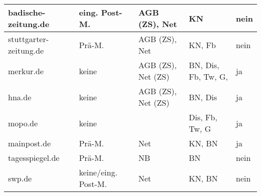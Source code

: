 \begin{landscape}
\begin{longtable}{l|llll}
badische-zeitung.de	& eing. Post-M.		& AGB (ZS), Net			& KN 							& nein \tabularnewline \hline
stuttgarter-zeitung.de	& Prä-M.		& AGB (ZS), Net			& KN, Fb 						& nein \tabularnewline \hline
merkur.de			& keine			& AGB (ZS), Net (ZS)		& BN, Dis, Fb, Tw, G, 				& ja \tabularnewline \hline
hna.de			& keine			& AGB (ZS), Net (ZS)		& BN, Dis 						& ja \tabularnewline \hline
mopo.de			& keine			&				& Dis, Fb, Tw, G 					& ja \tabularnewline \hline
mainpost.de		& Prä-M.		& Net				& KN, BN 						& ja \tabularnewline \hline
tagesspiegel.de		& Prä-M.		& NB				& BN 							& nein \tabularnewline \hline
swp.de			& keine/eing. Post-M.	& Net				& KN, BN 						& nein \tabularnewline \hline


\end{longtable}
\end{landscape}






